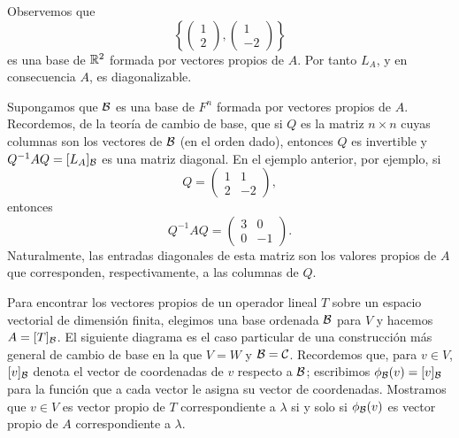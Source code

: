 \documentclass[12pt,a4paper]{book}
\begin{document}
\begin{ejemplo}
        Observemos que
        \begin{equation*}
            \left\{ \begin{pmatrix} 1 \\ 2 \end{pmatrix}, \begin{pmatrix} 1 \\ -2 \end{pmatrix} \right\}
        \end{equation*}
        es una base de $\mathbb{R}^2$ formada por vectores propios de $A$. Por tanto $L_A$, y en consecuencia $A$, es diagonalizable.
    \end{ejemplo}

    Supongamos que $\mathcal{B}$ es una base de $F^n$ formada por vectores propios de $A$. Recordemos, de la teoría de cambio de base, que si $Q$ es la matriz $n\times n$ cuyas columnas son los vectores de $\mathcal{B}$ (en el orden dado), entonces $Q$ es invertible y $Q^{-1}AQ = [L_A]_{\mathcal{B}}$ es una matriz diagonal. En el ejemplo anterior, por ejemplo, si
    \begin{equation*}
        Q = \begin{pmatrix} 1 & 1 \\ 2 & -2 \end{pmatrix},
    \end{equation*}
    entonces
    \begin{equation*}
        Q^{-1}AQ = \begin{pmatrix} 3 & 0 \\ 0 & -1 \end{pmatrix}.
    \end{equation*}
    Naturalmente, las entradas diagonales de esta matriz son los valores propios de $A$ que corresponden, respectivamente, a las columnas de $Q$.

    Para encontrar los vectores propios de un operador lineal $T$ sobre un espacio vectorial de dimensión finita, elegimos una base ordenada $\mathcal{B}$ para $V$ y hacemos $A = [T]_{\mathcal{B}}$. El siguiente diagrama es el caso particular de una construcción más general de cambio de base en la que $V = W$ y $\mathcal{B} = \mathcal{C}$. Recordemos que, para $v \in V$, $[v]_{\mathcal{B}}$ denota el vector de coordenadas de $v$ respecto a $\mathcal{B}$; escribimos $\phi_{\mathcal{B}}(v) = [v]_{\mathcal{B}}$ para la función que a cada vector le asigna su vector de coordenadas. Mostramos que $v \in V$ es vector propio de $T$ correspondiente a $\lambda$ si y solo si $\phi_{\mathcal{B}}(v)$ es vector propio de $A$ correspondiente a $\lambda$.
\end{document}
